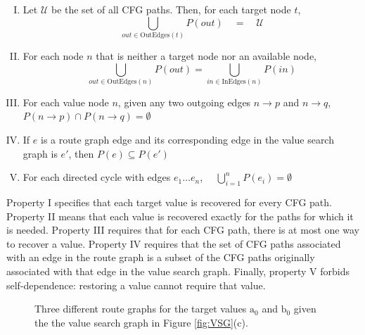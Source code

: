 \documentclass[12pt]{gatech-thesis}
\begin{document}
\begin{enumerate}[I)]

\item Let $\mathcal{U}$ be the set of all CFG paths. Then, for each target node $t$, 
	$$\bigcup_{\mathit{out} \in \text{OutEdges}(t)}P(\mathit{out}) \quad = \quad \mathcal{U} $$ 
	\label{rg-property-1}

\item For each node $n$ that is neither a target node nor an available node,
	$$\bigcup_{\mathit{out} \in \text{OutEdges} (n)} P(out) = \bigcup_{\mathit{in} \in \text{InEdges} (n)}P( \mathit{in} )$$ 

\item For each value node $n$, given any two outgoing edges $n\to p$ and $n\to q$, $P(n\to p) \cap P(n\to q) = \emptyset$ 

\item If $e$ is a route graph edge and its corresponding edge in the value search graph is $e'$, then $P(e) \subseteq P(e')$
	\label{rg-property-4}

\item For each directed cycle with edges $e_1 \dots e_n$,  $\quad \bigcup_{i=1}^n{P(e_{i})} = \emptyset$
	\label{rg-property-5}

\end{enumerate}

Property I specifies that each target value is recovered for every CFG path. 
Property II means that each value is recovered exactly for the paths for which it is needed.
Property III requires that for each CFG path, there is at most one way to recover a value. 
Property IV requires that the set of CFG paths associated with an edge in the route graph is a subset of the CFG paths originally associated with that edge in the value search graph. Finally, property V forbids self-dependence: restoring a value cannot require that value. 

\begin{figure}[htb]
\caption{Three different route graphs for the target values $\text{a}_{\text{0}}$ and $\text{b}_{\text{0}}$ given the the value search graph in Figure \ref{fig:VSG}(c). %
}
\label{fig:RG}
\end{figure}
\end{document}
